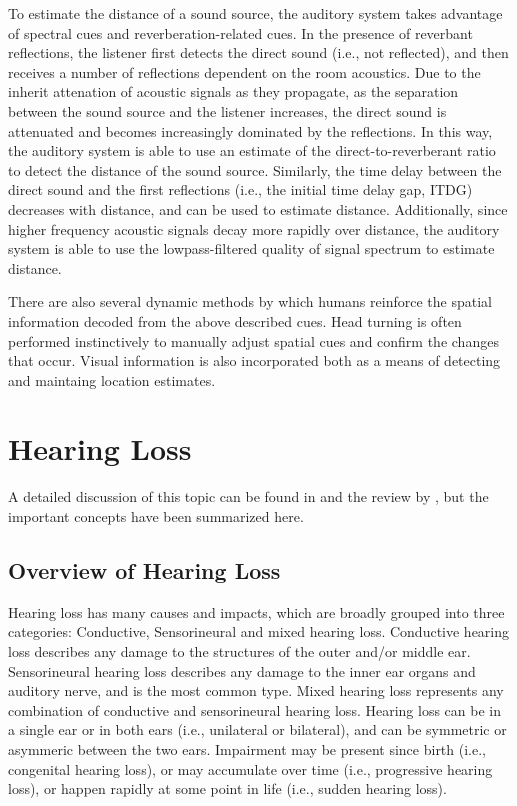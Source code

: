 To estimate the distance of a sound source, the auditory system takes advantage of spectral cues and reverberation-related cues. In the presence of reverbant reflections, the listener first detects the direct sound (i.e., not reflected), and then receives a number of reflections dependent on the room acoustics. Due to the inherit attenation of acoustic signals as they propagate, as the separation between the sound source and the listener increases, the direct sound is attenuated and becomes increasingly dominated by the reflections. In this way, the auditory system is able to use an estimate of the direct-to-reverberant ratio to detect the distance of the sound source. Similarly, the time delay between the direct sound and the first reflections (i.e., the initial time delay gap, ITDG) decreases with distance, and can be used to estimate distance. Additionally, since higher frequency acoustic signals decay more rapidly over distance, the auditory system is able to use the lowpass-filtered quality of signal spectrum to estimate distance.

There are also several dynamic methods by which humans reinforce the spatial information decoded from the above described cues. Head turning is often performed instinctively to manually adjust spatial cues and confirm the changes that occur. Visual information is also incorporated both as a means of detecting and maintaing location estimates.

\section{Hearing Loss}

A detailed discussion of this topic can be found in \cite{pickles2013} and the review by \cite{shapiro2021hearing}, but the important concepts have been summarized here. 

\subsection{Overview of Hearing Loss}

Hearing loss has many causes and impacts, which are broadly grouped into three categories: Conductive, Sensorineural and mixed hearing loss. Conductive hearing loss describes any damage to the structures of the outer and/or middle ear. Sensorineural hearing loss describes any damage to the inner ear organs and auditory nerve, and is the most common type. Mixed hearing loss represents any combination of conductive and sensorineural hearing loss. Hearing loss can be in a single ear or in both ears (i.e., unilateral or bilateral), and can be symmetric or asymmeric between the two ears. Impairment may be present since birth (i.e., congenital hearing loss), or may accumulate over time (i.e., progressive hearing loss), or happen rapidly at some point in life (i.e., sudden hearing loss).

